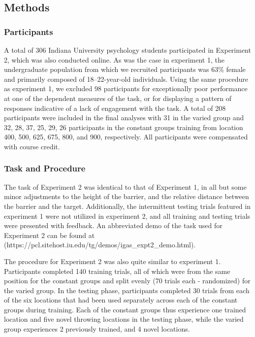 \documentclass[
  12pt,
  letterpaper,
]{article}
\begin{document}
\subsection{Methods}\label{methods-1}

\subsubsection{Participants}\label{participants-1}

A total of 306 Indiana University psychology students participated in
Experiment 2, which was also conducted online. As was the case in
experiment 1, the undergraduate population from which we recruited
participants was 63\% female and primarily composed of 18--22-year-old
individuals. Using the same procedure as experiment 1, we excluded 98
participants for exceptionally poor performance at one of the dependent
measures of the task, or for displaying a pattern of responses
indicative of a lack of engagement with the task. A total of 208
participants were included in the final analyses with 31 in the varied
group and 32, 28, 37, 25, 29, 26 participants in the constant groups
training from location 400, 500, 625, 675, 800, and 900, respectively.
All participants were compensated with course credit.

\subsubsection{Task and Procedure}\label{task-and-procedure}

The task of Experiment 2 was identical to that of Experiment 1, in all
but some minor adjustments to the height of the barrier, and the
relative distance between the barrier and the target. Additionally, the
intermittent testing trials featured in experiment 1 were not utilized
in experiment 2, and all training and testing trials were presented with
feedback. An abbreviated demo of the task used for Experiment 2 can be
found at (https://pcl.sitehost.iu.edu/tg/demos/igas\_expt2\_demo.html).

The procedure for Experiment 2 was also quite similar to experiment 1.
Participants completed 140 training trials, all of which were from the
same position for the constant groups and split evenly (70 trials each -
randomized) for the varied group. In the testing phase, participants
completed 30 trials from each of the six locations that had been used
separately across each of the constant groups during training. Each of
the constant groups thus experience one trained location and five novel
throwing locations in the testing phase, while the varied group
experiences 2 previously trained, and 4 novel locations.
\end{document}
